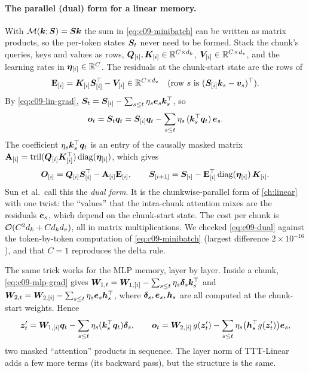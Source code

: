 \paragraph{The parallel (dual) form for a linear memory.} With $\mathcal{M}(\bm{k};\bm{S}) = \bm{S}\bm{k}$
the sum in \eqref{eq:c09-minibatch} can be written as matrix products, so the per-token states
$\bm{S}_t$ never need to be formed. Stack the chunk's queries, keys and values as rows,
$\bm{Q}_{[i]}, \bm{K}_{[i]} \in \mathbb{R}^{C\times d_k}$, $\bm{V}_{[i]}\in\mathbb{R}^{C\times d_v}$, and the learning
rates in $\bm{\eta}_{[i]} \in \mathbb{R}^{C}$. The residuals at the chunk-start state are the rows of
\begin{equation}
  \mathbf{E}_{[i]} = \bm{K}_{[i]}\bm{S}_{[i]}^{\top} - \bm{V}_{[i]} \in \mathbb{R}^{C\times d_v}
  \quad(\text{row } s \text{ is } (\bm{S}_{[i]}\bm{k}_s - \bm{v}_s)^{\top}).
\end{equation}
By \eqref{eq:c09-lin-grad}, $\bm{S}_t = \bm{S}_{[i]} - \sum_{s\le t}\eta_s \bm{e}_s\bm{k}_s^{\top}$, so
\begin{equation}
  \bm{o}_t = \bm{S}_t\bm{q}_t = \bm{S}_{[i]}\bm{q}_t - \sum_{s \le t} \eta_s\, (\bm{k}_s^{\top}\bm{q}_t)\, \bm{e}_s .
\end{equation}
The coefficient $\eta_s\bm{k}_s^{\top}\bm{q}_t$ is an entry of the causally masked matrix
$\mathbf{A}_{[i]} = \operatorname{tril}(\bm{Q}_{[i]}\bm{K}_{[i]}^{\top})\operatorname{diag}(\bm{\eta}_{[i]})$, which gives
\begin{equation}\label{eq:c09-dual}
  \bm{O}_{[i]} = \bm{Q}_{[i]}\bm{S}_{[i]}^{\top} - \mathbf{A}_{[i]}\mathbf{E}_{[i]}, \qquad
  \bm{S}_{[i+1]} = \bm{S}_{[i]} - \mathbf{E}_{[i]}^{\top}\operatorname{diag}(\bm{\eta}_{[i]})\,\bm{K}_{[i]} .
\end{equation}
Sun et al.\ call this the \emph{dual form}. It is the chunkwise-parallel form of
\cref{ch:linear} with one twist: the ``values'' that the intra-chunk attention mixes are the
residuals $\bm{e}_s$, which depend on the chunk-start state. The cost per chunk is
$\mathcal{O}(C^2 d_k + C d_k d_v)$, all in matrix multiplications. We checked \eqref{eq:c09-dual}
against the token-by-token computation of \eqref{eq:c09-minibatch} (largest difference
$2\times10^{-16}$), and that $C = 1$ reproduces the delta rule.

The same trick works for the MLP memory, layer by layer. Inside a chunk,
\eqref{eq:c09-mlp-grad} gives $\bm{W}_{1,t} = \bm{W}_{1,[i]} - \sum_{s\le t}\eta_s\bm{\delta}_s\bm{k}_s^{\top}$
and $\bm{W}_{2,t} = \bm{W}_{2,[i]} - \sum_{s\le t}\eta_s\bm{e}_s\bm{h}_s^{\top}$, where $\bm{\delta}_s,\bm{e}_s,\bm{h}_s$
are all computed at the chunk-start weights. Hence
\begin{equation}\label{eq:c09-dual-mlp}
  \bm{z}_t' = \bm{W}_{1,[i]}\bm{q}_t - \sum_{s\le t}\eta_s(\bm{k}_s^{\top}\bm{q}_t)\bm{\delta}_s, \qquad
  \bm{o}_t = \bm{W}_{2,[i]}\, g(\bm{z}_t') - \sum_{s\le t}\eta_s\big(\bm{h}_s^{\top} g(\bm{z}_t')\big)\bm{e}_s ,
\end{equation}
two masked ``attention'' products in sequence. The layer norm of TTT-Linear adds a few more
terms (its backward pass), but the structure is the same.


